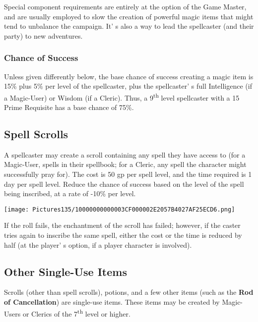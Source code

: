 \documentclass[a4paper,twoside,openany,10pt]{book}
\begin{document}
\begin{multicols}{2}
Special component requirements are entirely at the option of the Game Master, and are usually employed to slow the creation of powerful magic items that might tend to unbalance the campaign. It' s also a way to lead the spellcaster (and their party) to new adventures.

\subsubsection{Chance of Success}\label{chance-of-success}

Unless given differently below, the base chance of success creating a magic item is 15\% plus 5\% per level of the spellcaster, plus the spellcaster' s full Intelligence (if a Magic-User) or Wisdom (if a Cleric). Thus, a 9\textsuperscript{th} level spellcaster with a 15 Prime Requisite has a base chance of 75\%.

\subsection{Spell Scrolls}\label{spell-scrolls}

A spellcaster may create a scroll containing any spell they have access to (for a Magic-User, spells in their spellbook; for a Cleric, any spell the character might successfully pray for). The cost is 50 gp per spell level, and the time required is 1 day per spell level. Reduce the chance of success based on the level of the spell being inscribed, at a rate of -10\% per level.

\begin{center}
	\texttt{[image: Pictures135/10000000000003CF000002E2057B4027AF25ECD6.png]}
\end{center}

If the roll fails, the enchantment of the scroll has failed; however, if the caster tries again to inscribe the same spell, either the cost or the time is reduced by half (at the player' s option, if a player character is involved).

\subsection{Other Single-Use Items}\label{other-single-use-items}

Scrolls (other than spell scrolls), potions, and a few other items (such as the \textbf{Rod of Cancellation}) are single-use items. These items may be created by Magic-Users or Clerics of the 7\textsuperscript{th} level or higher.


\end{multicols}
\end{document}
